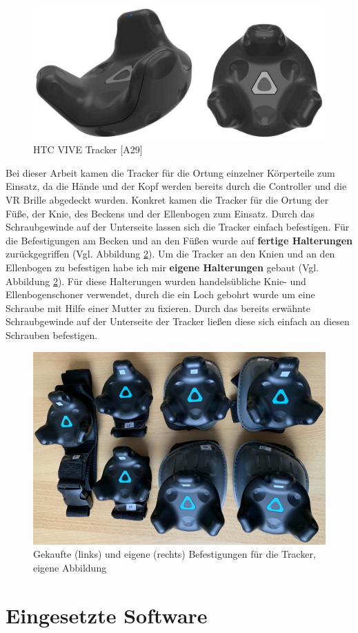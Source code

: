 \newline
\begin{figure}[h]
	\centering
	\includegraphics[width=0.5\linewidth]{Bilder/A29_ViveTracker}
	\caption{HTC VIVE Tracker [A29]}
	\label{fig:ViveTracker}
\end{figure}
\newline
Bei dieser Arbeit kamen die Tracker für die Ortung einzelner Körperteile zum Einsatz, da die Hände und der Kopf werden bereits durch die Controller und die VR Brille abgedeckt wurden. Konkret kamen die Tracker für die Ortung der Füße, der Knie, des Beckens und der Ellenbogen zum Einsatz. Durch das Schraubgewinde auf der Unterseite lassen sich die Tracker einfach befestigen. Für die Befestigungen am Becken und an den Füßen wurde auf \textbf{fertige Halterungen} zurückgegriffen (Vgl. Abbildung \ref{fig:Mounts}). Um die Tracker an den Knien und an den Ellenbogen zu befestigen habe ich mir \textbf{eigene Halterungen} gebaut (Vgl. Abbildung \ref{fig:Mounts}). Für diese Halterungen wurden handelsübliche Knie- und Ellenbogenschoner verwendet, durch die ein Loch gebohrt wurde um eine Schraube mit Hilfe einer Mutter zu fixieren. Durch das bereits erwähnte Schraubgewinde auf der Unterseite der Tracker ließen diese sich einfach an diesen Schrauben befestigen.
\begin{figure}[h]
	\centering
	\includegraphics[width=0.7\linewidth]{Bilder/A32_Mounts}
	\caption{Gekaufte (links) und eigene (rechts) Befestigungen für die Tracker, eigene Abbildung}
	\label{fig:Mounts}
\end{figure}

\section{Eingesetzte Software}\label{sec:Software}
